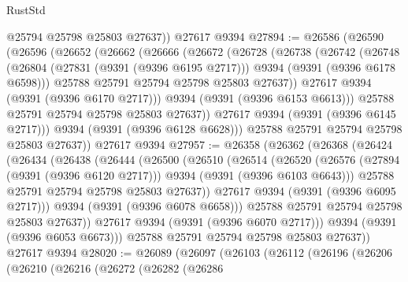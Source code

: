 \begin{lexlean}{RustStd}
\begin{coremodule}
        @25794
        @25798
        @25803
        @27637))
    @27617
    @9394
@27894 := @26586
    (@26590
      (@26596
        (@26652
          (@26662
            (@26666
              (@26672
                (@26728
                  (@26738
                    (@26742
                      (@26748
                        (@26804
                          (@27831 (@9391 (@9396 @6195 @2717)))
                          @9394
                          (@9391 (@9396 @6178 @6598)))
                        @25788
                        @25791
                        @25794
                        @25798
                        @25803
                        @27637))
                    @27617
                    @9394
                    (@9391 (@9396 @6170 @2717)))
                  @9394
                  (@9391 (@9396 @6153 @6613)))
                @25788
                @25791
                @25794
                @25798
                @25803
                @27637))
            @27617
            @9394
            (@9391 (@9396 @6145 @2717)))
          @9394
          (@9391 (@9396 @6128 @6628)))
        @25788
        @25791
        @25794
        @25798
        @25803
        @27637))
    @27617
    @9394
@27957 := @26358
    (@26362
      (@26368
        (@26424
          (@26434
            (@26438
              (@26444
                (@26500
                  (@26510
                    (@26514
                      (@26520
                        (@26576
                          (@27894 (@9391 (@9396 @6120 @2717)))
                          @9394
                          (@9391 (@9396 @6103 @6643)))
                        @25788
                        @25791
                        @25794
                        @25798
                        @25803
                        @27637))
                    @27617
                    @9394
                    (@9391 (@9396 @6095 @2717)))
                  @9394
                  (@9391 (@9396 @6078 @6658)))
                @25788
                @25791
                @25794
                @25798
                @25803
                @27637))
            @27617
            @9394
            (@9391 (@9396 @6070 @2717)))
          @9394
          (@9391 (@9396 @6053 @6673)))
        @25788
        @25791
        @25794
        @25798
        @25803
        @27637))
    @27617
    @9394
@28020 := @26089
    (@26097
      (@26103
        (@26112
          (@26196
            (@26206
              (@26210
                (@26216
                  (@26272
                    (@26282
                      (@26286

\end{coremodule}
\end{lexlean}
